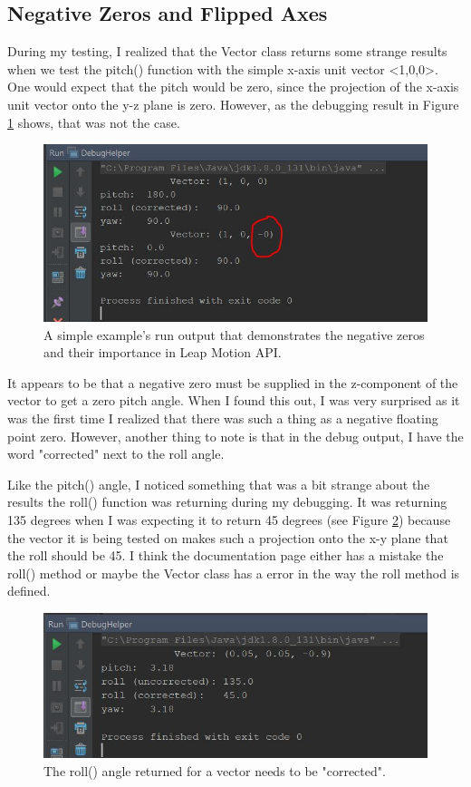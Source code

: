 \subsection{Negative Zeros and Flipped Axes}
During my testing, I realized that the Vector class returns some strange results when we test the pitch() function with the simple x-axis unit vector <1,0,0>. One would expect that the pitch would be zero, since the projection of the x-axis unit vector onto the y-z plane is zero. However, as the debugging result in Figure \ref{fig:negZero} shows, that was not the case. 
\begin{figure}[H]
\centering
\includegraphics[scale=0.95]{Figures/4_negZero.JPG}
\caption[Pitch() Debugging]{A simple example's run output that demonstrates the negative zeros and their importance in Leap Motion API.}
\label{fig:negZero}
\end{figure}

It appears to be that a negative zero must be supplied in the z-component of the vector to get a zero pitch angle. When I found this out, I was very surprised as it was the first time I realized that there was such a thing as a negative floating point zero. However,  another thing to note is that in the debug output, I have the word "corrected" next to the roll angle. 

Like the pitch() angle, I noticed something that was a bit strange about the results the roll() function was returning during my debugging. It was returning 135 degrees when I was expecting it to return 45 degrees (see Figure \ref{fig:uncorrectedRoll}) because the vector it is being tested on makes such a projection onto the x-y plane that the roll should be 45. I think the documentation page either has a mistake the roll() method or maybe the Vector class has a error in the way the roll method is defined. 
\begin{figure}[H]
\centering
\includegraphics[scale=0.95]{Figures/4_rollUncorrected.JPG}
\caption[Roll Debugging]{The roll() angle returned for a vector needs to be "corrected".}
\label{fig:uncorrectedRoll}
\end{figure}


